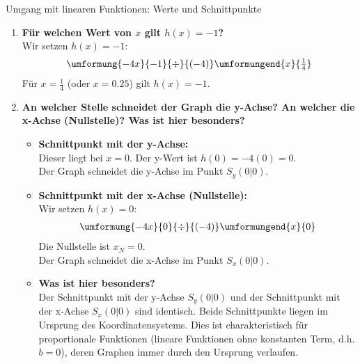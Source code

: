 \begin{loesungsumgebung}{Umgang mit linearen Funktionen: Werte und Schnittpunkte}
\begin{enumerate}[label=(\alph*)]
    \item \textbf{Für welchen Wert von $x$ gilt $h(x) = -1$?} \\
    Wir setzen $h(x)=-1$:
    $$
    \begin{array}{r c l c l}
    \umformung{-4x}{-1}{\div}{(-4)}
    \umformungend{x}{\frac{1}{4}} %
    \end{array}
    $$
    Für $x=\frac{1}{4}$ (oder $x=0.25$) gilt $h(x)=-1$.

    \item \textbf{An welcher Stelle schneidet der Graph die y-Achse? An welcher die x-Achse (Nullstelle)? Was ist hier besonders?}
    \begin{itemize}
        \item \textbf{Schnittpunkt mit der y-Achse:} \\
        Dieser liegt bei $x=0$. Der y-Wert ist $h(0) = -4(0) = 0$. \\
        Der Graph schneidet die y-Achse im Punkt $S_y(0|0)$.
        \item \textbf{Schnittpunkt mit der x-Achse (Nullstelle):} \\
        Wir setzen $h(x)=0$:
        $$
        \begin{array}{r c l c l}
        \umformung{-4x}{0}{\div}{(-4)}
        \umformungend{x}{0}
        \end{array}
        $$
        Die Nullstelle ist $x_N = 0$. \\
        Der Graph schneidet die x-Achse im Punkt $S_x(0|0)$.
        \item \textbf{Was ist hier besonders?} \\
        Der Schnittpunkt mit der y-Achse $S_y(0|0)$ und der Schnittpunkt mit der x-Achse $S_x(0|0)$ sind identisch. Beide Schnittpunkte liegen im Ursprung des Koordinatensystems. Dies ist charakteristisch für proportionale Funktionen (lineare Funktionen ohne konstanten Term, d.h. $b=0$), deren Graphen immer durch den Ursprung verlaufen.
    \end{itemize}
\end{enumerate}

\end{loesungsumgebung}



